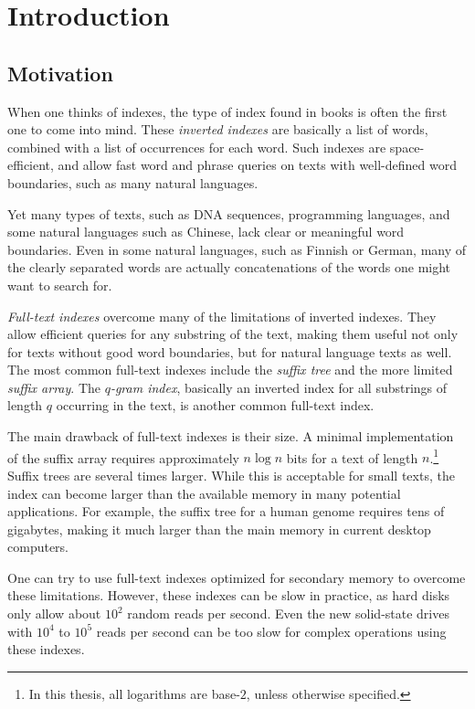 \chapter{Introduction}

\section{Motivation}

When one thinks of indexes, the type of index found in books is often the first one to come into mind.
These \emph{inverted indexes} are basically a list of words,
combined with a list of occurrences for each word. Such indexes are space-efficient, and allow fast word and phrase queries on texts with well-defined
word boundaries, such as many natural languages.

Yet many types of texts, such as DNA sequences, programming languages, and
some natural languages such as Chinese, lack clear or meaningful word
boundaries. Even in some natural languages, such as Finnish or German, many of
the clearly separated words are actually concatenations of the words one might
want to search for.

\emph{Full-text indexes} overcome many of the limitations of inverted indexes.
They allow efficient queries for any substring of the text, making them
useful not only for texts without good word boundaries, but for natural
language texts as well. The most common full-text indexes include the {\em
suffix tree} and the more limited \emph{suffix array}. The \emph{$q$\nobreakdash-gram index}, basically an inverted index for all substrings of length $q$ occurring in the text, is another common full-text index.

The main drawback of full-text indexes is their size. A minimal
implementation of the suffix array requires approximately $n \log n$ bits for a
text of length $n$.\footnote{In this thesis, all logarithms are base\nobreakdash-$2$, unless otherwise specified.} Suffix trees are several times larger. While this is
acceptable for small texts, the index can become larger than the available
memory in many potential applications. For example, the suffix tree for a
human genome requires tens of gigabytes, making it much larger than the main
memory in current desktop computers.

One can try to use full-text indexes optimized for secondary memory
\cite{Kaerkkaeinen2003} to overcome these limitations. However, these
indexes can be slow in practice, as hard disks only allow about $10^{2}$
random reads per second. Even the new solid-state drives with $10^{4}$ to $10^{5}$
reads per second can be too slow for complex operations using these indexes.

